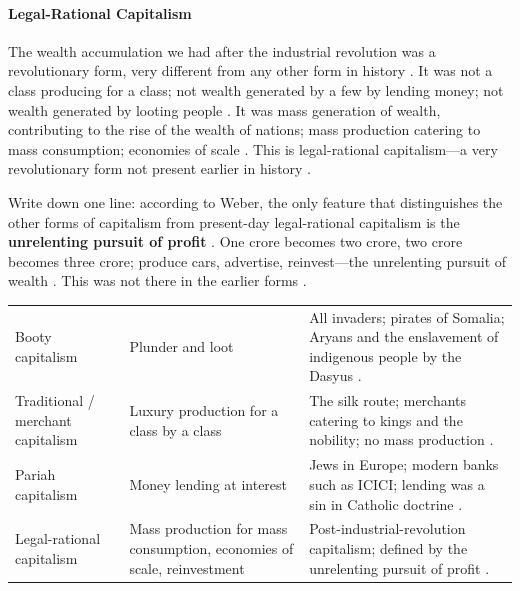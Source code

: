 \paragraph{Legal-Rational Capitalism}
The wealth accumulation we had after the industrial revolution was a revolutionary form, very different from any other form in history .
It was not a class producing for a class; not wealth generated by a few by lending money; not wealth generated by looting people .
It was mass generation of wealth, contributing to the rise of the wealth of nations; mass production catering to mass consumption; economies of scale . This is legal-rational capitalism---a very revolutionary form not present earlier in history .

\begin{KeyConcept}
Write down one line: according to Weber, the only feature that distinguishes the other forms of capitalism from present-day legal-rational capitalism is the \textbf{unrelenting pursuit of profit} .
One crore becomes two crore, two crore becomes three crore; produce cars, advertise, reinvest---the unrelenting pursuit of wealth . This was not there in the earlier forms .
\end{KeyConcept}

\vspace{6pt}
\noindent
\begin{tabularx}{\textwidth}{>{\hsize}Y >{\hsize}Y >{\hsize}Y}
\toprule
{}
 &  &  \\
\midrule
Booty capitalism & Plunder and loot & All invaders; pirates of Somalia; Aryans and the enslavement of indigenous people by the Dasyus . \\
\midrule
Traditional / merchant capitalism & Luxury production for a class by a class & The silk route; merchants catering to kings and the nobility; no mass production . \\
\midrule
Pariah capitalism & Money lending at interest & Jews in Europe; modern banks such as ICICI; lending was a sin in Catholic doctrine . \\
\midrule
Legal-rational capitalism & Mass production for mass consumption, economies of scale, reinvestment & Post-industrial-revolution capitalism; defined by the unrelenting pursuit of profit . \\
\bottomrule
\end{tabularx}
\vspace{6pt}

